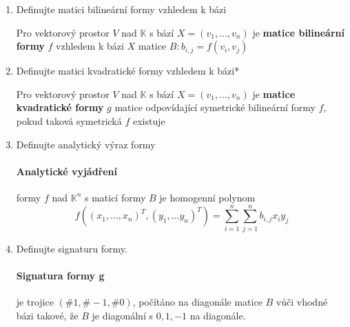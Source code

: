 \documentclass[10pt,a4paper]{article}
\theoremstyle{plain}
\begin{document}
\begin{enumerate}
\item Definujte matici bilineární formy vzhledem k bázi

Pro vektorový prostor $V$ nad $\mathbb{K}$ s bází $X = (v_1, ..., v_n)$ je \textbf{matice bilineární formy} $f$ vzhledem k bázi $X$ matice $B: b_{i,j} = f(v_i, v_j)$

\item Definujte matici kvadratické formy vzhledem k bázi*

Pro vektorový prostor $V$ nad $\mathbb{K}$ s bází $X = (v_1, ..., v_n)$ je \textbf{matice kvadratické formy} $g$ matice odpovídající symetrické bilineární formy $f$, pokud taková symetrická $f$ existuje

\item Definujte analytický výraz formy

\paragraph{Analytické vyjádření} formy $f$ nad $\mathbb{K}^n$ s maticí formy $B$ je homogenní polynom
\[ f((x_1,...,x_n)^T,(y_1,...y_n)^T)= \sum^n_{i=1}\sum^n_{j=1}b_{i,j}x_iy_j\]

\item Definujte signaturu formy.

\paragraph{Signatura formy g} je trojice $(\#1, \#-1, \#0)$, počítáno na
diagonále matice $B$ vůči vhodné bázi takové, že $B$ je diagonální s $0,1,-1$ na diagonále.


\end{enumerate}

\newpage
\end{document}
